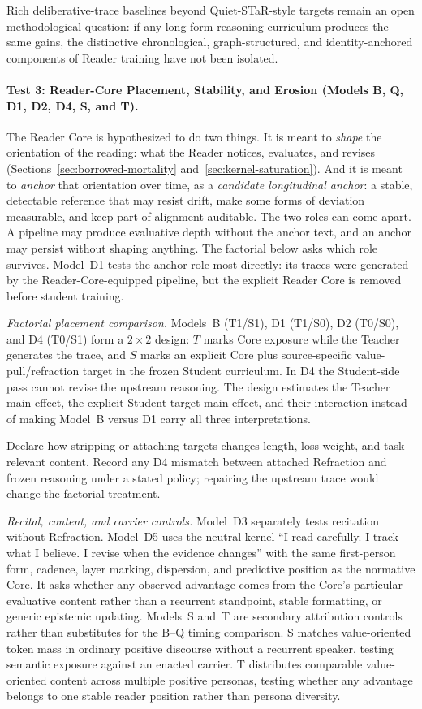 \documentclass[11pt]{article}
\begin{document}
Rich deliberative-trace baselines beyond Quiet-STaR-style targets
remain an open methodological question: if any long-form reasoning curriculum
produces the same gains, the distinctive chronological, graph-structured, and
identity-anchored components of Reader training have not been isolated.

\paragraph{Test 3: Reader-Core Placement, Stability, and Erosion (Models B, Q, D1, D2, D4, S, and T).}
\label{sec:core-stability-test}
The Reader Core is hypothesized to do two things. It is meant to \emph{shape}
the orientation of the reading: what the Reader notices, evaluates, and revises
(Sections~\ref{sec:borrowed-mortality} and~\ref{sec:kernel-saturation}). And it
is meant to \emph{anchor} that orientation over time, as a \emph{candidate
longitudinal anchor}: a stable, detectable reference that may resist drift,
make some forms of deviation measurable, and keep part of alignment auditable.
The two roles can come apart. A pipeline may produce evaluative depth without
the anchor text, and an anchor may persist without shaping anything. The
factorial below asks which role survives. Model~D1 tests the anchor role most
directly: its traces were
generated by the Reader-Core-equipped pipeline, but the explicit Reader Core is
removed before student training.

\emph{Factorial placement comparison.} Models~B (T1/S1), D1 (T1/S0),
D2 (T0/S0), and D4 (T0/S1) form a $2\times2$ design: $T$ marks Core exposure while the
Teacher generates the trace, and $S$ marks an explicit Core plus
source-specific value-pull/refraction target in the frozen Student curriculum.
In D4 the Student-side pass cannot revise the upstream reasoning. The design
estimates the Teacher main effect, the explicit Student-target main effect, and
their interaction instead of making Model~B versus D1 carry all three
interpretations.

Declare how stripping or attaching targets changes length, loss weight, and
task-relevant content. Record any D4 mismatch between attached Refraction and
frozen reasoning under a stated policy; repairing the upstream trace would
change the factorial treatment.

\emph{Recital, content, and carrier controls.} Model~D3 separately tests
recitation without Refraction. Model~D5 uses the neutral kernel ``I read carefully. I track what I believe. I revise when the
evidence changes'' with the same first-person form, cadence, layer marking,
dispersion, and predictive position as the normative Core. It asks whether any
observed advantage comes from the Core's particular evaluative content rather
than a recurrent standpoint, stable formatting, or generic epistemic updating.
Models~S and~T are secondary attribution controls rather than substitutes for
the B--Q timing comparison. S matches value-oriented token mass in ordinary
positive discourse without a recurrent speaker, testing semantic exposure
against an enacted carrier. T distributes comparable value-oriented content
across multiple positive personas, testing whether any advantage belongs to
one stable reader position rather than persona diversity.
\end{document}
